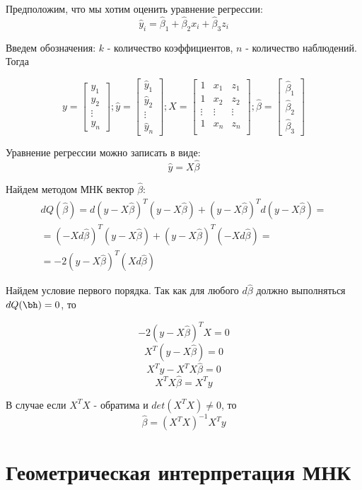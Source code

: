 \documentclass[12pt]{article} %
\theoremstyle{definition} %
\def \hb{\hat{\beta}}
\def \hy{\hat{y}}
\begin{document}
Предположим, что мы хотим оценить уравнение регрессии:
\[
\hy_i = \hb_1 + \hb_2 x_i + \hb_3 z_i
\]

Введем обозначения: $k$ - количество коэффициентов, $n$ - количество наблюдений. Тогда

\[
y = \begin{bmatrix}
           y_{1} \\
           y_{2} \\
           \vdots \\
           y_{n}
         \end{bmatrix}; 
\hy = \begin{bmatrix}
           \hy_{1} \\
           \hy_{2} \\
           \vdots \\
           \hy_{n}
         \end{bmatrix};
X =  \begin{bmatrix}
           1 & x_1 & z_1 \\
           1 & x_2 & z_2 \\
           \vdots & \vdots & \vdots \\
           1 & x_n &  z_n \\
         \end{bmatrix};
\hb = \begin{bmatrix}
           \hb_{1} \\
           \hb_{2} \\
           \hb_{3}
         \end{bmatrix}
\]

Уравнение регрессии можно записать в виде:
\[
\hy = X\hb
\]

Найдем методом МНК вектор $\hb$:
\begin{eqnarray*}
dQ(\hb) = d( y-X\hb)^T( y-X\hb) + ( y-X\hb)^Td( y-X\hb) = \\
=(-Xd\hb)^T( y-X\hb) + (y-X\hb)^T(-Xd\hb)=\\
=-2(y-X\hb)^T(Xd\hb)
\end{eqnarray*}

Найдем условие первого порядка. Так как для любого $d\hb$ должно выполняться $dQ(\bh)=0$, то

\[
-2(y-X\hb)^TX = 0
\]
\[
X^T(y-X\hb) = 0
\]
\[
X^Ty-X^TX\hb = 0
\]
\[
X^TX\hb = X^Ty
\]

В случае если $X^TX$ - обратима и $det(X^TX) \neq 0$, то
\[
\hb = (X^TX)^{-1}X^Ty
\]

\section{Геометрическая интерпретация МНК}
\end{document}
